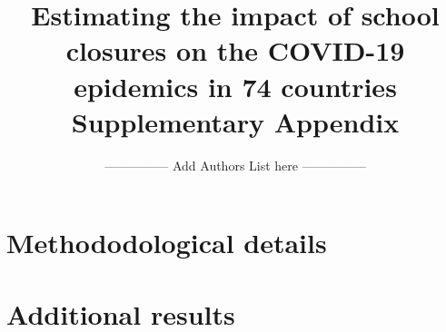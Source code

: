 \documentclass[10pt,a4paper]{report}
\author{
    ---------------  Add Authors List here  ---------------
}
\title{
    Estimating the impact of school closures on the COVID-19 epidemics in 74 countries\\
    \Large Supplementary Appendix
}
\date{\vspace{-5ex}} %
\begin{document}
\maketitle
\tableofcontents
\newpage
\chapter{Methododological details}




\newpage
\printbibliography


\chapter{Additional results}

\end{document}
